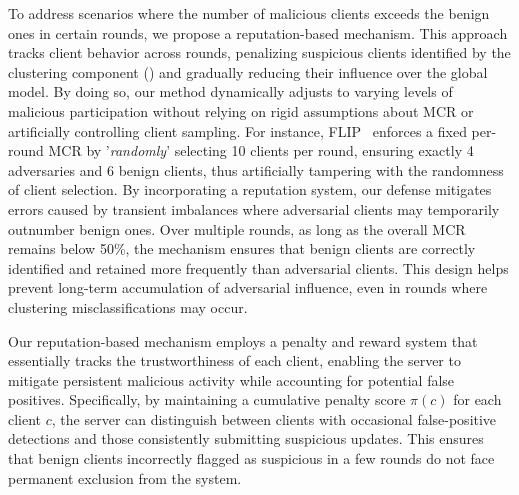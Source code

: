 
To address scenarios where the number of malicious clients exceeds the benign ones in certain rounds, we propose a reputation-based mechanism. This approach tracks client behavior across rounds, penalizing suspicious clients identified by the clustering component () and gradually reducing their influence over the global model. By doing so, our method dynamically adjusts to varying levels of malicious participation without relying on rigid assumptions about MCR or artificially controlling client sampling. For instance, FLIP~\cite{zhang2023flip} enforces a fixed per-round MCR by '\textit{randomly}' selecting 10 clients per round, ensuring exactly 4 adversaries and 6 benign clients, thus artificially tampering with the randomness of client selection.
By incorporating a reputation system, our defense mitigates errors caused by transient imbalances where adversarial clients may temporarily outnumber benign ones. Over multiple rounds, as long as the overall MCR remains below 50\%, the mechanism ensures that benign clients are correctly identified and retained more frequently than adversarial clients. This design helps prevent long-term accumulation of adversarial influence, even in rounds where clustering misclassifications may occur.

Our reputation-based mechanism employs a penalty and reward system that essentially tracks the trustworthiness of each client, enabling the server to mitigate persistent malicious activity while accounting for potential false positives. Specifically, by maintaining a cumulative penalty score \(\pi(c)\) for each client \(c\), the server can distinguish between clients with occasional false-positive detections and those consistently submitting suspicious updates. This ensures that benign clients incorrectly flagged as suspicious in a few rounds do not face permanent exclusion from the system.

